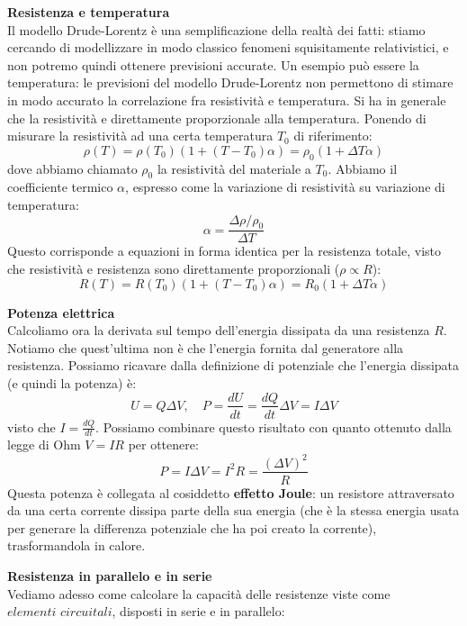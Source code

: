 \documentclass[a4paper,12pt]{article}
\begin{document}
\textbf{Resistenza e temperatura} \\
Il modello Drude-Lorentz è una semplificazione della realtà dei fatti: stiamo cercando di modellizzare in modo classico fenomeni squisitamente relativistici, e non potremo quindi ottenere previsioni accurate. Un esempio può essere la temperatura:
le previsioni del modello Drude-Lorentz non permettono di stimare in modo accurato la correlazione fra resistività e temperatura. Si ha in generale che la resistività e direttamente proporzionale alla temperatura. 
Ponendo di misurare la resistività
ad una certa temperatura $T_0$ di riferimento:
$$ \rho(T) = \rho(T_0)(1 + (T-T_0) \alpha) = \rho_0(1+\Delta T \alpha) $$
dove abbiamo chiamato $\rho_0$ la resistività del materiale a $T_0$. Abbiamo il coefficiente termico $\alpha$, espresso come la variazione di resistività su variazione di temperatura:
$$ \alpha = \frac{\Delta \rho / \rho_0}{\Delta T} $$
Questo corrisponde a equazioni in forma identica per la resistenza totale, visto che resistività e resistenza sono direttamente proporzionali ($\rho \propto R$):
$$ R(T) = R(T_0)(1 + (T-T_0) \alpha) = R_0(1+\Delta T \alpha) $$
\par\smallskip
\textbf{Potenza elettrica} \\
Calcoliamo ora la derivata sul tempo dell'energia dissipata da una resistenza $R$. Notiamo che quest'ultima non è che l'energia fornita dal generatore alla resistenza. Possiamo ricavare dalla definizione di potenziale che l'energia dissipata (e quindi la potenza) è:
$$ U = Q\Delta V, \quad P = \frac{dU}{dt} = \frac{dQ }{dt}\Delta V =  I\Delta V $$
visto che $I = \frac{dQ}{dt}$. Possiamo combinare questo risultato con quanto ottenuto dalla legge di Ohm $V = IR$ per ottenere:
$$ P = I\Delta V = I^2R = \frac{(\Delta V)^2}{R} $$
Questa potenza è collegata al cosiddetto \textbf{effetto Joule}: un resistore attraversato da una certa corrente dissipa parte della sua energia (che è la stessa energia usata per generare la differenza potenziale che ha poi creato la corrente), trasformandola in calore.
\par\smallskip
\textbf{Resistenza in parallelo e in serie} \\
Vediamo adesso come calcolare la capacità delle resistenze viste come $\textit{elementi circuitali}$, disposti in serie e in parallelo:
\end{document}

